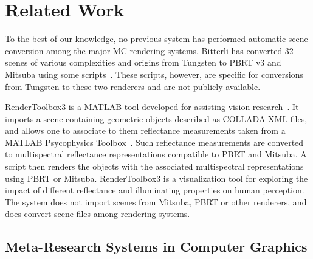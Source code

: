 \section{Related Work}
\label{(sec:related_work)}

To the best of our knowledge, no previous system has performed automatic scene conversion among the major MC rendering systems. 
Bitterli has converted 32 scenes of various complexities and origins from Tungsten to PBRT v3 and Mitsuba using some scripts~\cite{tungsten}. These scripts, however, are specific for conversions from Tungsten to these two renderers and are not publicly available. 

RenderToolbox3 is a MATLAB tool developed for assisting vision research~\cite{rendertoolbox}. It imports a scene containing geometric objects described as COLLADA XML files, and allows one to associate to them reflectance measurements taken from a MATLAB Psycophysics Toolbox~\cite{Brainard1997}. Such reflectance measurements are converted to multispectral reflectance representations compatible to PBRT and Mitsuba. A script then renders the objects with the associated multispectral representations using PBRT or Mitsuba. RenderToolbox3 is a visualization tool for exploring the impact of different reflectance and illuminating properties on human perception.       
The system does not import scenes from Mitsuba, PBRT or other renderers, and does convert scene files among rendering systems. 

\subsection{Meta-Research Systems in Computer Graphics}

